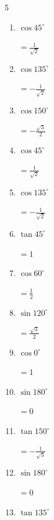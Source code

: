 \begin{multicols}{5}
\begin{enumerate}
        $\displaystyle =\frac{\sqrt{3}}{2}$

  \item $\displaystyle \cos{45^\circ}$

        $\displaystyle =\frac{1}{\sqrt{2}}$

  \item $\displaystyle \cos{135^\circ}$

        $\displaystyle =-\frac{1}{\sqrt{2}}$

  \item $\displaystyle \cos{150^\circ}$

        $\displaystyle =-\frac{\sqrt{3}}{2}$

  \item $\displaystyle \cos{45^\circ}$

        $\displaystyle =\frac{1}{\sqrt{2}}$

  \item $\displaystyle \cos{135^\circ}$

        $\displaystyle =-\frac{1}{\sqrt{2}}$

  \item $\displaystyle \tan{45^\circ}$

        $\displaystyle =1$

  \item $\displaystyle \cos{60^\circ}$

        $\displaystyle =\frac{1}{2}$

  \item $\displaystyle \sin{120^\circ}$

        $\displaystyle =\frac{\sqrt{3}}{2}$

  \item $\displaystyle \cos{0^\circ}$

        $\displaystyle =1$

\columnbreak %

  \item $\displaystyle \sin{180^\circ}$

        $\displaystyle =0$

  \item $\displaystyle \tan{150^\circ}$

        $\displaystyle =-\frac{1}{\sqrt{3}}$

  \item $\displaystyle \sin{180^\circ}$

        $\displaystyle =0$

  \item $\displaystyle \tan{135^\circ}$


\end{enumerate}
\end{multicols}
